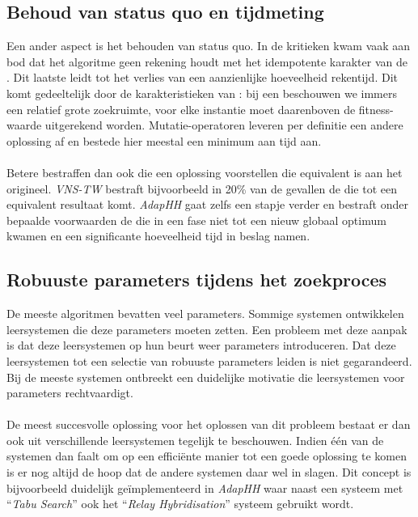 \subsection{Behoud van status quo en tijdmeting}
Een ander aspect is het behouden van status quo. In de kritieken kwam vaak aan bod dat het algoritme geen rekening houdt met het idempotente karakter van de \abls{} \abhn{}. Dit laatste leidt tot het verlies van een aanzienlijke hoeveelheid rekentijd. Dit komt gedeeltelijk door de karakteristieken van \abls{}: bij een \abls{} \abh{} beschouwen we immers een relatief grote zoekruimte, voor elke instantie moet daarenboven de fitness-waarde uitgerekend worden. Mutatie-operatoren leveren per definitie een andere oplossing af en bestede hier meestal een minimum aan tijd aan.

\paragraph{}
Betere \abhhn{} bestraffen dan ook \abhn{} die een oplossing voorstellen die equivalent is aan het origineel. \emph{VNS-TW} bestraft bijvoorbeeld in 20\% van de gevallen de \abh{} die tot een equivalent resultaat komt. \emph{AdapHH} gaat zelfs een stapje verder en bestraft onder bepaalde voorwaarden de \abhn{} die in een fase niet tot een nieuw globaal optimum kwamen en een significante hoeveelheid tijd in beslag namen.

\subsection{Robuuste parameters tijdens het zoekproces}
De meeste algoritmen bevatten veel parameters. Sommige systemen ontwikkelen leersystemen die deze parameters moeten zetten. Een probleem met deze aanpak is dat deze leersystemen op hun beurt weer parameters introduceren. Dat deze leersystemen tot een selectie van robuuste parameters leiden is niet gegarandeerd. Bij de meeste systemen ontbreekt een duidelijke motivatie die leersystemen voor parameters rechtvaardigt.

\paragraph{}
De meest succesvolle oplossing voor het oplossen van dit probleem bestaat er dan ook uit verschillende leersystemen tegelijk te beschouwen. Indien \'e\'en van de systemen dan faalt om op een effici\"ente manier tot een goede oplossing te komen is er nog altijd de hoop dat de andere systemen daar wel in slagen. Dit concept is bijvoorbeeld duidelijk ge\"implementeerd in \emph{AdapHH} waar naast een systeem met ``\emph{Tabu Search}'' ook het ``\emph{Relay Hybridisation}'' systeem gebruikt wordt.